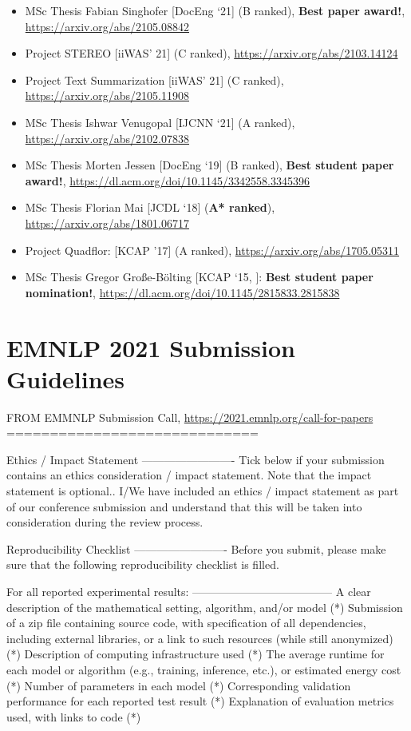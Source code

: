\documentclass[sigconf, nonacm]{acmart}
\begin{document}
\begin{itemize}
\item MSc Thesis Fabian Singhofer [DocEng ‘21] (B ranked), \textbf{Best paper award!}, \url{https://arxiv.org/abs/2105.08842}
\item Project STEREO [iiWAS’ 21] (C ranked), \url{https://arxiv.org/abs/2103.14124}
\item Project Text Summarization [iiWAS’ 21] (C ranked), \url{https://arxiv.org/abs/2105.11908}
\item MSc Thesis Ishwar Venugopal [IJCNN ‘21] (A ranked), \url{https://arxiv.org/abs/2102.07838}
\item MSc Thesis Morten Jessen [DocEng ‘19] (B ranked), \textbf{Best student paper award!}, \url{https://dl.acm.org/doi/10.1145/3342558.3345396}
\item MSc Thesis Florian Mai [JCDL ‘18] (\textbf{A* ranked}), \url{https://arxiv.org/abs/1801.06717}
\item Project Quadflor: [KCAP '17] (A ranked), \url{https://arxiv.org/abs/1705.05311}
\item MSc Thesis Gregor Große-Bölting [KCAP ‘15, \cite{DBLP:conf/kcap/Grosse-BoltingN15}]: \textbf{Best student paper nomination!}, \url{https://dl.acm.org/doi/10.1145/2815833.2815838}
\end{itemize}





\section{EMNLP 2021 Submission Guidelines}
\label{app:emnlp2021-checklist}

FROM EMMNLP Submission Call,
\url{https://2021.emnlp.org/call-for-papers}
=============================

Ethics / Impact Statement
-------------------------
Tick below if your submission contains an ethics consideration / impact statement. Note that the impact statement is optional..
  I/We have included an ethics / impact statement as part of our conference submission and understand that this will be taken into consideration during the review process.  
  
  
Reproducibility Checklist
-------------------------
Before you submit, please make sure that the following reproducibility checklist is filled.

For all reported experimental results:
--------------------------------------
A clear description of the mathematical setting, algorithm, and/or model (*)
Submission of a zip file containing source code, with specification of all dependencies, including external libraries, or a link to such resources (while still anonymized) (*)
Description of computing infrastructure used (*)
The average runtime for each model or algorithm (e.g., training, inference, etc.), or estimated energy cost (*)
Number of parameters in each model (*)
Corresponding validation performance for each reported test result (*)
Explanation of evaluation metrics used, with links to code (*)
\end{document}
